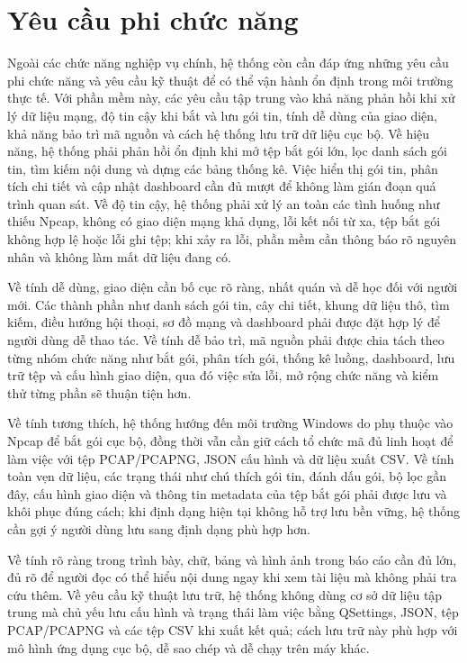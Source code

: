\documentclass[../DoAn.tex]{subfiles}
\begin{document}
\section{Yêu cầu phi chức năng}
Ngoài các chức năng nghiệp vụ chính, hệ thống còn cần đáp ứng những yêu cầu phi chức năng và yêu cầu kỹ thuật để có thể vận hành ổn định trong môi trường thực tế. Với phần mềm này, các yêu cầu tập trung vào khả năng phản hồi khi xử lý dữ liệu mạng, độ tin cậy khi bắt và lưu gói tin, tính dễ dùng của giao diện, khả năng bảo trì mã nguồn và cách hệ thống lưu trữ dữ liệu cục bộ.
Về hiệu năng, hệ thống phải phản hồi ổn định khi mở tệp bắt gói lớn, lọc danh sách gói tin, tìm kiếm nội dung và dựng các bảng thống kê. Việc hiển thị gói tin, phân tích chi tiết và cập nhật dashboard cần đủ mượt để không làm gián đoạn quá trình quan sát. Về độ tin cậy, hệ thống phải xử lý an toàn các tình huống như thiếu Npcap, không có giao diện mạng khả dụng, lỗi kết nối từ xa, tệp bắt gói không hợp lệ hoặc lỗi ghi tệp; khi xảy ra lỗi, phần mềm cần thông báo rõ nguyên nhân và không làm mất dữ liệu đang có.

Về tính dễ dùng, giao diện cần bố cục rõ ràng, nhất quán và dễ học đối với người mới. Các thành phần như danh sách gói tin, cây chi tiết, khung dữ liệu thô, tìm kiếm, điều hướng hội thoại, sơ đồ mạng và dashboard phải được đặt hợp lý để người dùng dễ thao tác. Về tính dễ bảo trì, mã nguồn phải được chia tách theo từng nhóm chức năng như bắt gói, phân tích gói, thống kê luồng, dashboard, lưu trữ tệp và cấu hình giao diện, qua đó việc sửa lỗi, mở rộng chức năng và kiểm thử từng phần sẽ thuận tiện hơn.

Về tính tương thích, hệ thống hướng đến môi trường Windows do phụ thuộc vào Npcap để bắt gói cục bộ, đồng thời vẫn cần giữ cách tổ chức mã đủ linh hoạt để làm việc với tệp PCAP/PCAPNG, JSON cấu hình và dữ liệu xuất CSV. Về tính toàn vẹn dữ liệu, các trạng thái như chú thích gói tin, đánh dấu gói, bộ lọc gần đây, cấu hình giao diện và thông tin metadata của tệp bắt gói phải được lưu và khôi phục đúng cách; khi định dạng hiện tại không hỗ trợ lưu bền vững, hệ thống cần gợi ý người dùng lưu sang định dạng phù hợp hơn.

Về tính rõ ràng trong trình bày, chữ, bảng và hình ảnh trong báo cáo cần đủ lớn, đủ rõ để người đọc có thể hiểu nội dung ngay khi xem tài liệu mà không phải tra cứu thêm. Về yêu cầu kỹ thuật lưu trữ, hệ thống không dùng cơ sở dữ liệu tập trung mà chủ yếu lưu cấu hình và trạng thái làm việc bằng QSettings, JSON, tệp PCAP/PCAPNG và các tệp CSV khi xuất kết quả; cách lưu trữ này phù hợp với mô hình ứng dụng cục bộ, dễ sao chép và dễ chạy trên máy khác.
\end{document}
